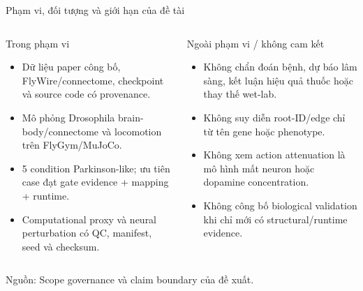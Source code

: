 \documentclass[10pt,aspectratio=169]{beamer}
\newcommand{\source}[1]{\par\vfill{\fontsize{6.0}{7}\selectfont\color{gray}Nguồn: #1\par}}
\begin{document}
\begin{frame}{Phạm vi, đối tượng và giới hạn của đề tài}
\begin{columns}[T,onlytextwidth]
\begin{block}{Trong phạm vi}
\begin{itemize}\small\setlength\itemsep{4pt}
\item Dữ liệu paper công bố, FlyWire/connectome, checkpoint và source code có provenance.
\item Mô phỏng Drosophila brain-body/connectome và locomotion trên FlyGym/MuJoCo.
\item 5 condition Parkinson-like; ưu tiên case đạt gate evidence + mapping + runtime.
\item Computational proxy và neural perturbation có QC, manifest, seed và checksum.
\end{itemize}
\end{block}
\begin{block}{Ngoài phạm vi / không cam kết}
\begin{itemize}\small\setlength\itemsep{4pt}
\item Không chẩn đoán bệnh, dự báo lâm sàng, kết luận hiệu quả thuốc hoặc thay thế wet-lab.
\item Không suy diễn root-ID/edge chỉ từ tên gene hoặc phenotype.
\item Không xem action attenuation là mô hình mất neuron hoặc dopamine concentration.
\item Không công bố biological validation khi chỉ mới có structural/runtime evidence.
\end{itemize}
\end{block}
\end{columns}
\source{Scope governance và claim boundary của đề xuất.}
\end{frame}
\end{document}
